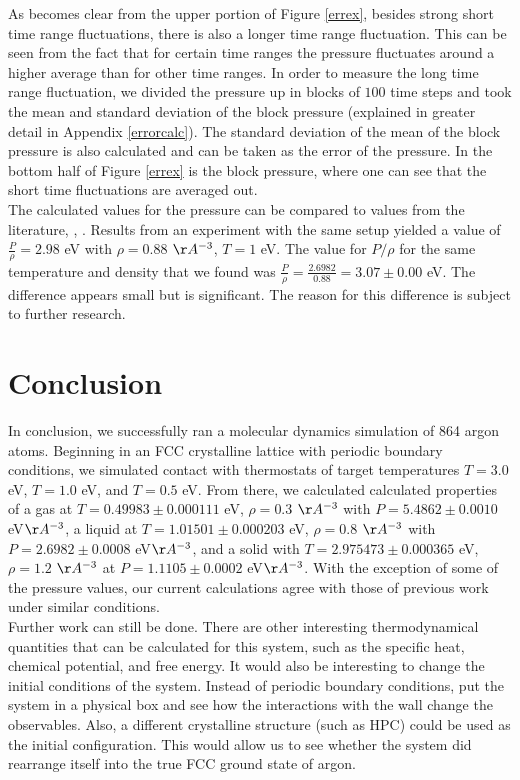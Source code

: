 \documentclass{article}
\begin{document}
\begin{multicols}{2}
As becomes clear from the upper portion of Figure \ref{errex}, besides strong short time range fluctuations, there is also a longer time range fluctuation.  This can be seen from the fact that for certain time ranges the pressure fluctuates around a higher average than for other time ranges.  In order to measure the long time range fluctuation, we divided the pressure up in blocks of $100$ time steps and took the mean and standard deviation of the block pressure (explained in greater detail in Appendix \ref{errorcalc}).  The standard deviation of the mean of the block pressure is also calculated and can be taken as the error of the pressure.  In the bottom half of Figure \ref{errex} is the block pressure, where one can see that the short time fluctuations are averaged out.\\

The calculated values for the pressure can be compared to values from the literature, \cite{thijssen}, \cite{verlet}. Results from an experiment with the same setup yielded a value of $\frac{P}{\rho} = 2.98$ eV with $\rho = 0.88$ $\AA ^{-3}$, $T = 1$ eV. The value for $P/\rho$ for the same temperature and density that we found was $\frac{P}{\rho} = \frac{2.6982}{0.88} = 3.07 \pm 0.00 $ eV.  The difference appears small but is significant. The reason for this difference is subject to further research.

\section{Conclusion}
\label{conc}

In conclusion, we successfully ran a molecular dynamics simulation of 864 argon atoms.  Beginning in an FCC crystalline lattice with periodic boundary conditions, we simulated contact with thermostats of target temperatures $T=3.0$ eV, $T=1.0$ eV, and $T=0.5$ eV.  From there, we calculated calculated properties of a gas at $T=0.49983 \pm 0.000111$ eV, $\rho=0.3$ $\AA ^{-3}$ with $P=5.4862 \pm 0.0010 $ eV$\AA^{-3}$, a liquid at $T= 1.01501 \pm 0.000203$ eV, $\rho =0.8$ $\AA ^{-3}$ with $P=2.6982 \pm 0.0008$ eV$\AA^{-3}$, and a solid with $T=2.975473 \pm 0.000365$  eV, $\rho=1.2$ $\AA ^{-3}$ at $P=1.1105 \pm 0.0002 $ eV$\AA^{-3}$.  With the exception of some of the pressure values, our current calculations agree with those of previous work under similar conditions.  \\

Further work can still be done.  There are other interesting thermodynamical quantities that can be calculated for this system, such as the specific heat, chemical potential, and free energy.  It would also be interesting to change the initial conditions of the system.  Instead of periodic boundary conditions, put the system in a physical box and see how the interactions with the wall change the observables.  Also, a different crystalline structure (such as HPC) could be used as the initial configuration.  This would allow us to see whether the system did rearrange itself into the true FCC ground state of argon. 


\end{multicols}
\end{document}
